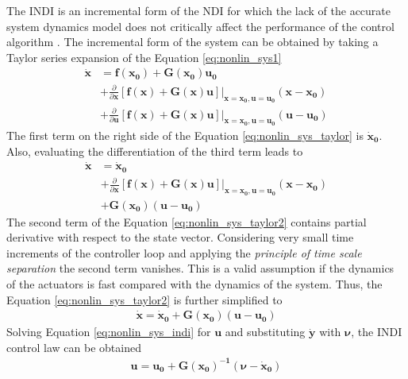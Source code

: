 \documentclass[11pt, a4paper, twoside]{report}
\begin{document}
The \acrshort{INDI} is an incremental form of the \acrshort{NDI} for which the lack of the accurate system dynamics model does not critically affect the performance of the control algorithm \cite{Silva}. The incremental form of the system can be obtained by taking a Taylor series expansion of the Equation \ref{eq:nonlin_sys1}
\begin{equation}
	\begin{split}
		\bm{\dot{x}} &= \bm{f(x_0)} + \bm{G(x_0)}\bm{u_0} \\
		&+ \frac{\partial}{\partial \bm{x}} [\bm{f(x)} + \bm{G(x)}\bm{u}] \bigg|_{\bm{x=x_0,u=u_0}} (\bm{x-x_0}) \\
		&+ \frac{\partial}{\partial \bm{u}} [\bm{f(x)} + \bm{G(x)}\bm{u}] \bigg|_{\bm{x=x_0,u=u_0}} (\bm{u-u_0}) 
		\label{eq:nonlin_sys_taylor}
	\end{split}
\end{equation}
The first term on the right side of the Equation \ref{eq:nonlin_sys_taylor} is $\bm{\dot{x}_0}$. Also, evaluating the differentiation of the third term leads to 
\begin{equation}
	\begin{split}
		\bm{\dot{x}} &= \bm{\dot{x}_0} \\ 
		&+ \frac{\partial}{\partial \bm{x}} [\bm{f(x)} + \bm{G(x)}\bm{u}] \bigg|_{\bm{x=x_0,u=u_0}} (\bm{x-x_0}) \\
		&+ \bm{G(x_0)} (\bm{u-u_0}) 
		\label{eq:nonlin_sys_taylor2}
	\end{split}
\end{equation}
The second term of the Equation \ref{eq:nonlin_sys_taylor2} contains partial derivative with respect to the state vector. Considering very small time increments of the controller loop and applying the \textit{principle of time scale separation} the second term vanishes. This is a valid assumption if the dynamics of the actuators is fast compared with the dynamics of the system. Thus, the Equation \ref{eq:nonlin_sys_taylor2} is further simplified to 
\begin{equation}
	\begin{split}
		\bm{\dot{x}} = \bm{\dot{x}_0} + \bm{G(x_0)} (\bm{u-u_0}) 
		\label{eq:nonlin_sys_indi}
	\end{split}
\end{equation}
Solving Equation \ref{eq:nonlin_sys_indi} for $\bm{u}$ and substituting $\dot{\bm{y}}$ with $\bm{\nu}$, the \acrshort{INDI} control law can be obtained
\begin{equation}
	\begin{split}
		\bm{u} = \bm{u_0} + \bm{G(x_0)^{-1}} (\bm{\nu} - \bm{\dot{x}_0})
		\label{eq:u_control_law_indi}
	\end{split}
\end{equation}
\end{document}
